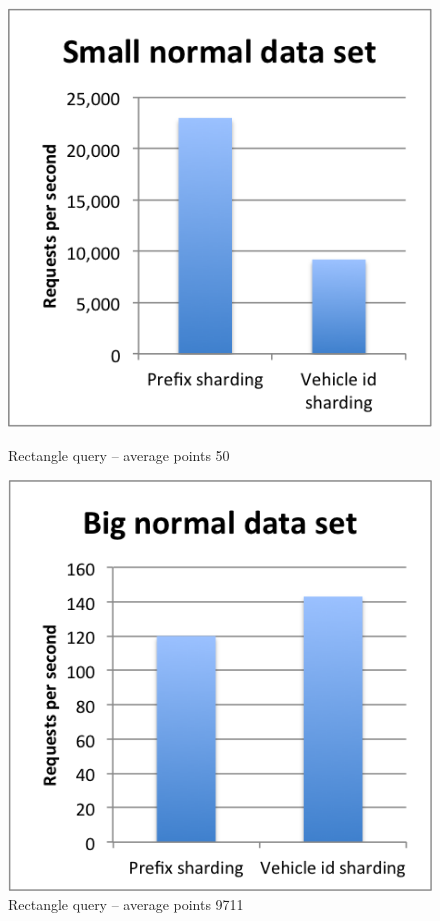 \documentclass[times, utf8, diplomski]{fer}
\begin{document}
\begin{figure}[h]
\includegraphics[width=\textwidth]{rectangle_small_normal}
\caption{Rectangle query -- average points 50}
\label{small_normal}
\endminipage\hfill
{}
\includegraphics[width=\textwidth]{rectangle_big_normal}
\caption{Rectangle query -- average points 9711}
\label{big_normal}
\endminipage\hfill
\end{figure}
\end{document}
